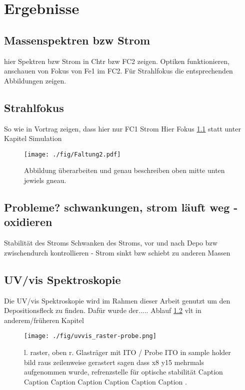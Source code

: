\chapter{Ergebnisse}
\section{Massenspektren bzw Strom}
hier Spektren bzw Strom in Chtr bzw FC2 zeigen. Optiken funktionieren, anschauen von Fokus von Fe1 im FC2.
Für Strahlfokus die entsprechenden Abbildungen zeigen.
\section{Strahlfokus}
So wie in Vortrag zeigen, dass hier nur FC1 Strom
Hier Fokus \ref{fig:faltung} statt unter Kapitel Simulation
\begin{figure}
    \centering
    \texttt{[image: ./fig/Faltung2.pdf]}
    \caption{Abbildung überarbeiten und genau beschreiben oben mitte unten jewiels gneau.}
    \label{fig:faltung}
\end{figure}
\section{Probleme? schwankungen, strom läuft weg - oxidieren}
Stabilität des Stroms
Schwanken des Stroms, vor und nach Depo bzw zwischendurch kontrollieren - Strom sinkt bzw schiebt zu anderen Massen















\newpage
\section{UV/vis Spektroskopie}
Die UV/vis Spektroskopie wird im Rahmen dieser Arbeit genutzt um den Depositionsfleck zu finden.
Dafür wurde der.....
Ablauf \ref{fig:uvvis_raster} vlt in anderem/früheren Kapitel

\begin{figure}
    \centering
    \texttt{[image: ./fig/uvvis\_raster-probe.png]}
    \caption{l. raster, oben r. Glasträger mit ITO / Probe ITO in sample holder bild raus
     zeilenweise gerastert sagen dass x8 y15 mehrmals aufgenommen wurde, refrenzstelle für optische stabilität    Caption Caption Caption Caption Caption Caption Caption .}
    \label{fig:uvvis_raster}
\end{figure}

